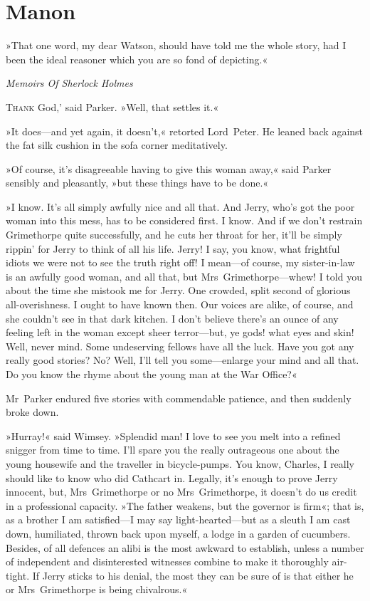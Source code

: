 
\chapter{Manon}
\epigraph{»That one word, my dear Watson, should have told me the whole story, had I been the ideal reasoner which you are so fond of depicting.«}{\textit{Memoirs Of Sherlock Holmes}}


\lettrine[lines=4,ante=`]{T}{hank} God,' said Parker. »Well, that settles it.«

\zz
»It does—and yet again, it doesn't,« retorted Lord~Peter. He leaned back against the fat silk cushion in the sofa corner meditatively.

»Of course, it's disagreeable having to give this woman away,« said Parker sensibly and pleasantly, »but these things have to be done.«

»I know. It's all simply awfully nice and all that. And Jerry, who's got the poor woman into this mess, has to be considered first. I know. And if we don't restrain Grimethorpe quite successfully, and he cuts her throat for her, it'll be simply rippin' for Jerry to think of all his life\textellipsis . Jerry! I say, you know, what frightful idiots we were not to see the truth right off! I mean—of course, my sister-in-law is an awfully good woman, and all that, but Mrs~Grimethorpe—whew! I told you about the time she mistook me for Jerry. One crowded, split second of glorious all-overishness. I ought to have known then. Our voices are alike, of course, and she couldn't see in that dark kitchen. I don't believe there's an ounce of any feeling left in the woman except sheer terror—but, ye gods! what eyes and skin! Well, never mind. Some undeserving fellows have all the luck. Have you got any really good stories? No? Well, I'll tell you some—enlarge your mind and all that. Do you know the rhyme about the young man at the War Office?«

Mr~Parker endured five stories with commendable patience, and then suddenly broke down.

»Hurray!« said Wimsey. »Splendid man! I love to see you melt into a refined snigger from time to time. I'll spare you the really outrageous one about the young housewife and the traveller in bicycle-pumps. You know, Charles, I really should like to know who did Cathcart in. Legally, it's enough to prove Jerry innocent, but, Mrs~Grimethorpe or no Mrs~Grimethorpe, it doesn't do us credit in a professional capacity. »The father weakens, but the governor is firm«; that is, as a brother I am satisfied—I may say light-hearted—but as a sleuth I am cast down, humiliated, thrown back upon myself, a lodge in a garden of cucumbers. Besides, of all defences an alibi is the most awkward to establish, unless a number of independent and disinterested witnesses combine to make it thoroughly air-tight. If Jerry sticks to his denial, the most they can be sure of is that either he or Mrs~Grimethorpe is being chivalrous.«

